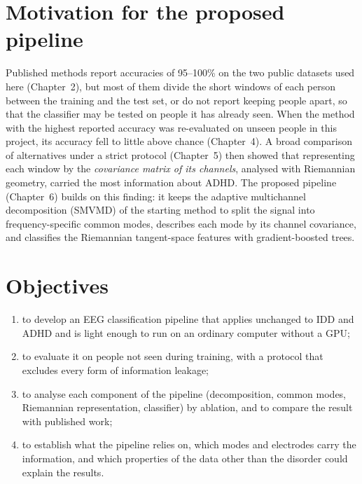 \section{Motivation for the proposed pipeline}
Published methods report accuracies of 95--100\% on the two public datasets used here
(Chapter~2), but most of them divide the short windows of each person between the training and
the test set, or do not report keeping people apart, so that the classifier may be tested on
people it has already seen. When the
method with the highest reported accuracy was re-evaluated on unseen people in this project, its
accuracy fell to little above chance (Chapter~4). A broad comparison of alternatives under a
strict protocol (Chapter~5) then showed that representing each window by the
\emph{covariance matrix of its channels}, analysed with Riemannian geometry, carried the most
information about ADHD. The proposed pipeline (Chapter~6) builds on this finding: it keeps the
adaptive multichannel decomposition (SMVMD) of the starting method to split the signal into
frequency-specific common modes, describes each mode by its channel covariance, and classifies
the Riemannian tangent-space features with gradient-boosted trees.

\section{Objectives}
\begin{enumerate}
\item to develop an EEG classification pipeline that applies unchanged to IDD and ADHD and is
      light enough to run on an ordinary computer without a GPU;
\item to evaluate it on people not seen during training, with a protocol that excludes every
      form of information leakage;
\item to analyse each component of the pipeline (decomposition, common modes, Riemannian
      representation, classifier) by ablation, and to compare the result with published work;
\item to establish what the pipeline relies on, which modes and electrodes carry the
      information, and which properties of the data other than the disorder could explain the
      results.
\end{enumerate}

